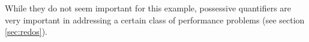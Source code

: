 While they do not seem important for this example, possessive quantifiers are very important in addressing a certain class of performance problems (see section \ref{sec:redos}).



